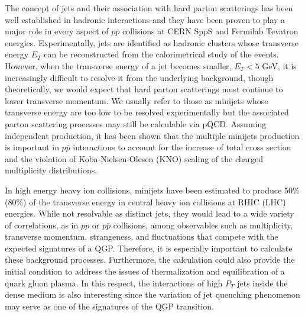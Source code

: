         The concept of jets and their association with 
hard parton scatterings has been well established in hadronic 
interactions and they have been proven to play a major role 
in every aspect of $p\overline{p}$ collisions at CERN 
$\mbox{Sp}\overline{\mbox{p}}\mbox{S}$ and Fermilab Tevatron 
energies\cite{geist}.  Experimentally, jets are identified 
as hadronic clusters whose transverse energy $E_T$ can be 
reconstructed from the calorimetrical study\cite{ua2jet,alba88} 
of the events. However, when the transverse energy of a jet becomes 
smaller, $E_T<5$ GeV, it is increasingly difficult to 
resolve it from the underlying background\cite{ua1minijet},
though theoretically, we would 
expect that hard parton scatterings must continue to lower 
transverse momentum. We usually refer to those as minijets 
whose transverse energy are too low to be resolved 
experimentally but the associated parton scattering 
processes may still be calculable via pQCD. Assuming 
independent production, it has been shown that 
the multiple minijets production is important in 
$p\bar{p}$ interactions to account for the increase 
of total cross section\cite{gaisser} and the violation 
of Koba-Nielsen-Olesen (KNO) scaling of the charged 
multiplicity distributions\cite{sjostrand,wang91a}.
  
        In high energy heavy ion collisions, minijets 
have been estimated\cite{kaja} to produce 50\% (80\%) of 
the transverse energy in central heavy ion collisions at 
RHIC (LHC) energies. While not resolvable as distinct jets,
they would lead to a wide variety of correlations, as in
$pp$ or $p\bar{p}$ collisions, among observables such as
multiplicity, transverse momentum, strangeness, and
fluctuations that compete with the expected signatures
of a QGP. Therefore, it is especially important to
calculate these background processes. Furthermore, 
the calculation could also provide the initial
condition to address the issues of thermalization
and equilibration of a quark gluon plasma. In this
respect, the interactions of high $P_T$ jets inside 
the dense medium is also interesting since the 
variation of jet quenching phenomenon may serve
as one of the signatures of the QGP transition\cite{gyu89}.
  

